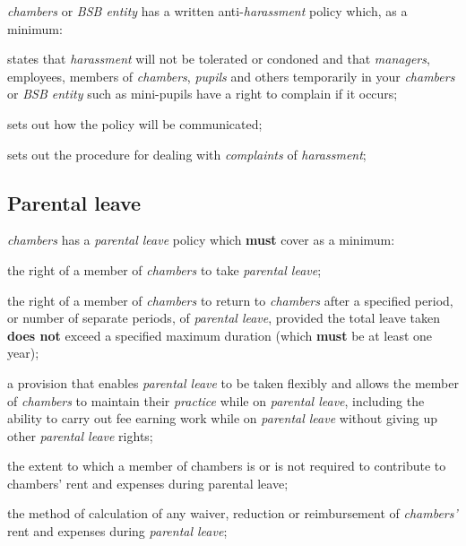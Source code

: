\begin{numlist}
\begin{alphlist}
\item \emph{chambers} or \emph{BSB entity} has a written
anti-\emph{harassment} policy which, as a minimum:
\begin{romlist}
\item states that \emph{harassment} will not be tolerated or condoned and
that \emph{managers}, employees, members of \emph{chambers},
\emph{pupils} and others temporarily in your \emph{chambers} or
\emph{BSB entity} such as mini-pupils have a right to complain if it
occurs;

\item sets out how the policy will be communicated;

\item sets out the procedure for dealing with \emph{complaints} of
\emph{harassment};\end{romlist}

\subsection{Parental leave}

\item \emph{chambers} has a \emph{parental leave} policy which \textcolor{myred}{\textbf{must}} cover
as a minimum:
\begin{romlist}
\item the right of a member of \emph{chambers} to take \emph{parental
leave};

\item the right of a member of \emph{chambers} to return to
\emph{chambers} after a specified period, or number of separate periods,
of \emph{parental leave}, provided the total leave taken \textcolor{myred}{\textbf{does not}} exceed
a specified maximum duration (which \textcolor{myred}{\textbf{must}} be at least one year);

\item a provision that enables \emph{parental leave} to be taken flexibly
and allows the member of \emph{chambers} to maintain their
\emph{practice} while on \emph{parental leave}, including the ability to
carry out fee earning work while on \emph{parental leave} without giving
up other \emph{parental leave} rights;

\item the extent to which a member of chambers is or is not required to
contribute to chambers' rent and expenses during parental leave;

\item the method of calculation of any waiver, reduction or reimbursement
of \emph{chambers'} rent and expenses during \emph{parental leave};


\end{romlist}
\end{alphlist}
\end{numlist}
